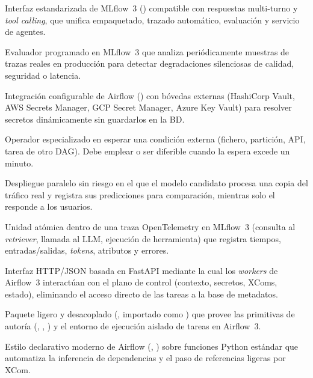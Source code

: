 {\begin{description}[style=standard, itemsep=2pt, parsep=0pt, topsep=4pt, leftmargin=1.1em, font=\sffamily\bfseries\color{PrimaryDark}]
\item[ResponsesAgent.]
Interfaz estandarizada de MLflow~3 () compatible con respuestas multi-turno y \textit{tool calling}, que unifica empaquetado, trazado automático, evaluación y servicio de agentes.

\item[Scheduled Scorer.]
Evaluador programado en MLflow~3 que analiza periódicamente muestras de trazas reales en producción para detectar degradaciones silenciosas de calidad, seguridad o latencia.

\item[Secrets Backend.]
Integración configurable de Airflow () con bóvedas externas (HashiCorp Vault, AWS Secrets Manager, GCP Secret Manager, Azure Key Vault) para resolver secretos dinámicamente sin guardarlos en la BD.

\item[Sensor.]
Operador especializado en esperar una condición externa (fichero, partición, API, tarea de otro DAG). Debe emplear  o ser diferible cuando la espera excede un minuto.

\item[Shadow Deployment.]
Despliegue paralelo sin riesgo en el que el modelo candidato procesa una copia del tráfico real y registra sus predicciones para comparación, mientras solo el  responde a los usuarios.

\item[Span (Tracing).]
Unidad atómica dentro de una traza OpenTelemetry en MLflow~3 (consulta al \textit{retriever}, llamada al LLM, ejecución de herramienta) que registra tiempos, entradas/salidas, \textit{tokens}, atributos y errores.

\item[Task Execution API (Airflow 3).]
Interfaz HTTP/JSON basada en FastAPI mediante la cual los \textit{workers} de Airflow~3 interactúan con el plano de control (contexto, secretos, XComs, estado), eliminando el acceso directo de las tareas a la base de metadatos.

\item[Task SDK (Airflow 3).]
Paquete ligero y desacoplado (, importado como ) que provee las primitivas de autoría (, , ) y el entorno de ejecución aislado de tareas en Airflow~3.

\item[TaskFlow API.]
Estilo declarativo moderno de Airflow (, ) sobre funciones Python estándar que automatiza la inferencia de dependencias y el paso de referencias ligeras por XCom.


\end{description}}
